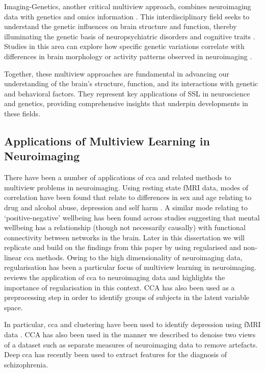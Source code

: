 Imaging-Genetics, another critical multiview approach, combines neuroimaging data with genetics and omics information \citep{le2008sparse}.
This interdisciplinary field seeks to understand the genetic influences on brain structure and function, thereby illuminating the genetic basis of neuropsychiatric disorders and cognitive traits \citep{bogdan2017imaging}.
Studies in this area can explore how specific genetic variations correlate with differences in brain morphology or activity patterns observed in neuroimaging \citep{liu2014review}.

Together, these multiview approaches are fundamental in advancing our understanding of the brain's structure, function, and its interactions with genetic and behavioral factors.
They represent key applications of SSL in neuroscience and genetics, providing comprehensive insights that underpin developments in these fields.

\subsection{Applications of Multiview Learning in Neuroimaging}

There have been a number of applications of \acrshort{cca} and related methods to multiview problems in neuroimaging.
Using resting state fMRI data, modes of correlation have been found that relate to differences in sex and age relating to drug and alcohol abuse, depression and self harm \citep{mihalik2019brain}.
A similar mode relating to `positive-negative' wellbeing has been found across studies \citep{smith2015positive} suggesting that mental wellbeing has a relationship (though not necessarily causally) with functional connectivity between networks in the brain.
Later in this dissertation we will replicate and build on the findings from this paper by using regularised and non-linear \acrshort{cca} methods.
Owing to the high dimensionality of neuroimaging data, regularisation has been a particular focus of multiview learning in neuroimaging. \citet{mihalik2022canonical} reviews the application of \acrshort{cca} to neuroimaging data and highlights the importance of regularisation in this context. \citet{bilenko2016pyrcca} 
CCA has also been used as a preprocessing step in order to identify groups of subjects in the latent variable space.

In particular, \acrshort{cca} and clustering have been used to identify depression using fMRI data \citep{dinga2019evaluating,drysdale2017resting}.
CCA has also been used in the manner we described to denoise two \gls{views} of a dataset such as separate measures of neuroimaging data \citep{zhuang2020technical} to remove artefacts.
Deep \acrshort{cca} has recently been used to extract features for the diagnosis of schizophrenia\citep{qi2016deep}.

